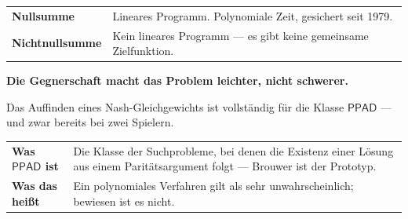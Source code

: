 \begin{merksatz}
\begin{center}
{\small
\renewcommand{\arraystretch}{1.52}
\begin{tabular}{@{}P{2.8cm}P{5.8cm}@{}}
\toprule
\textbf{Nullsumme} & Lineares Programm. Polynomiale Zeit, gesichert seit 1979.\\
\textbf{Nichtnull\-summe} & Kein lineares Programm --- es gibt keine gemeinsame Zielfunktion.\\
\bottomrule
\end{tabular}}
\end{center}

\begin{center}
\begin{minipage}{0.9\textwidth}
\textbf{Die Gegnerschaft macht das Problem leichter, nicht schwerer.}
\end{minipage}
\end{center}

Das Auffinden eines Nash-Gleichgewichts ist vollständig für die Klasse $\mathsf{PPAD}$ --- und zwar bereits bei zwei Spielern.

\begin{center}
{\small
\renewcommand{\arraystretch}{1.5}
\begin{tabular}{@{}P{2.4cm}P{6.2cm}@{}}
\toprule
\textbf{Was $\mathsf{PPAD}$ ist} & Die Klasse der Suchprobleme, bei denen die Existenz einer Lösung aus einem Paritätsargument folgt --- Brouwer ist der Prototyp.\\
\textbf{Was das heißt} & Ein polynomiales Verfahren gilt als sehr unwahrscheinlich; bewiesen ist es nicht.\\
\bottomrule
\end{tabular}}
\end{center}

\begin{center}
\begin{minipage}{0.88\textwidth}
\end{minipage}
\end{center}

\begin{center}
\begin{minipage}{0.88\textwidth}
\end{minipage}
\end{center}
\end{merksatz}


